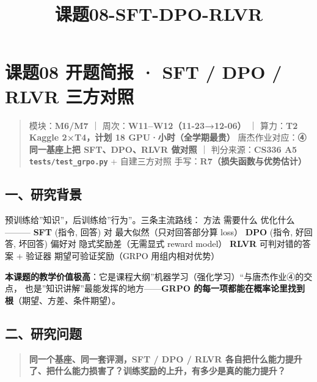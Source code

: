 \documentclass[
  chinese,
  11pt,
]{ctexart}
\title{课题08-SFT-DPO-RLVR}
\author{}
\date{}
\begin{document}
\maketitle

{
\setcounter{tocdepth}{2}
\tableofcontents
}
\section{课题08 开题简报 · SFT / DPO / RLVR 三方对照}\label{ux8bfeux989808-ux5f00ux9898ux7b80ux62a5-sft-dpo-rlvr-ux4e09ux65b9ux5bf9ux7167}

\begin{quote}
模块：\textbf{M6/M7} ｜ 周次：\textbf{W11--W12（11-23→12-06）} ｜ 算力：\textbf{T2 Kaggle 2×T4，计划 18 GPU·小时（全学期最贵）} 唐杰作业对应：\textbf{④ 同一基座上把 SFT、DPO、RLVR 做对照} ｜ 判分来源：\textbf{CS336 A5 \texttt{tests/test\_grpo.py}} + 自建三方对照 手写：\textbf{R7（损失函数与优势估计）}
\end{quote}

\subsection{一、研究背景}\label{ux4e00ux7814ux7a76ux80ccux666f}

预训练给''知识''，后训练给''行为''。三条主流路线： \textbar{} 方法 \textbar{} 需要什么 \textbar{} 优化什么 \textbar{} \textbar---\textbar---\textbar---\textbar{} \textbar{} \textbf{SFT} \textbar{} (指令, 回答) 对 \textbar{} 最大似然（只对回答部分算 loss） \textbar{} \textbar{} \textbf{DPO} \textbar{} (指令, 好回答, 坏回答) 偏好对 \textbar{} 隐式奖励差（无需显式 reward model） \textbar{} \textbar{} \textbf{RLVR} \textbar{} 可判对错的答案 + 验证器 \textbar{} 期望可验证奖励（GRPO 用组内相对优势） \textbar{}

\textbf{本课题的教学价值极高}：它是课程大纲''机器学习（强化学习）``与唐杰作业④的交点， 也是''知识讲解''最能发挥的地方------\textbf{GRPO 的每一项都能在概率论里找到根}（期望、方差、条件期望）。

\subsection{二、研究问题}\label{ux4e8cux7814ux7a76ux95eeux9898}

\begin{quote}
\textbf{同一个基座、同一套评测，SFT / DPO / RLVR 各自把什么能力提升了、把什么能力损害了？训练奖励的上升，有多少是真的能力提升？}
\end{quote}
\end{document}
